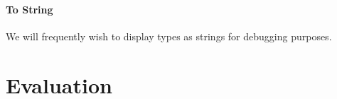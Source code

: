 \paragraph{To String} We will frequently wish to display types as strings for debugging purposes. 

\section{Evaluation}

\label{ref:afg_figma}